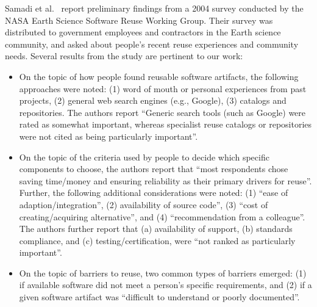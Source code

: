 \documentclass{casicswhitepaper}
\begin{document}
Samadi et al.~\cite{samadi_2004} report preliminary findings from a 2004 survey conducted by the NASA Earth Science Software Reuse Working Group. Their survey was distributed to government employees and contractors in the Earth science community, and asked about people's recent reuse experiences and community needs.  Several results from the study are pertinent to our work:
\begin{itemize}

\item On the topic of how people found reusable software artifacts, the following approaches were noted: (1) word of mouth or personal experiences from past projects, (2) general web search engines (e.g., Google), (3) catalogs and repositories.  The authors report ``Generic search tools (such as Google) were rated as somewhat important, whereas specialist reuse catalogs or repositories were not cited as being particularly important''.

\item On the topic of the criteria used by people to decide which specific components to choose, the authors report that ``most respondents chose saving time/money and ensuring reliability as their primary drivers for reuse''.  Further, the following additional considerations were noted: (1) ``ease of adaption/integration'', (2) availability of source code'', (3) ``cost of creating/acquiring alternative'', and (4) ``recommendation from a colleague''.  The authors further report that (a) availability of support, (b) standards compliance, and (c) testing/certification, were ``not ranked as particularly important''.

\item On the topic of barriers to reuse, two common types of barriers emerged: (1) if available software did not meet a person's specific requirements, and (2) if a given software artifact was ``difficult to understand or poorly documented''.

\end{itemize}
\end{document}

